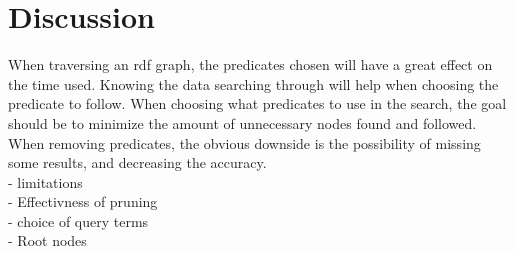
\chapter{Discussion}
When traversing an rdf graph, the predicates chosen will have a great effect on the time used. Knowing the data searching through will help when choosing the predicate to follow. When choosing what predicates to use in the search, the goal should be to minimize the amount of unnecessary nodes found and followed. When removing predicates, the obvious downside is the possibility of missing some results, and decreasing the accuracy.\\  

- limitations\\
- Effectivness of pruning\\
- choice of query terms\\
- Root nodes\\



\clearpage